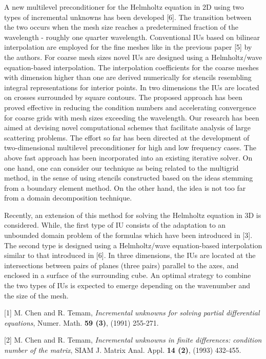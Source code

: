 \documentclass{report}
\begin{document}
A new multilevel preconditioner for the Helmholtz equation in 2D
using two types of incremental unknowns has been developed [6]. The
transition between the two occurs when the mesh size reaches a
predetermined fraction of the wavelength - roughly one quarter
wavelength. Conventional IUs based on bilinear interpolation are employed
for the fine meshes like in the previous paper [5] by the authors. For
coarse mesh sizes novel IUs are designed using a Helmholtz/wave
equation-based interpolation. The interpolation coefficients for the
coarse meshes with dimension higher than one are derived numerically for
stencils resembling integral representations for interior points. In two
dimensions the IUs are located on crosses surrounded by square contours.
The proposed approach has been proved
effective in reducing the condition numbers and accelerating
convergence for coarse grids with mesh sizes exceeding the wavelength.
Our research has been aimed at devising novel computational schemes that
facilitate analysis of large scattering problems. The effort so far has
been directed at the development of two-dimensional multilevel
preconditioner for high and low frequency cases. The above fast approach
has been incorporated into an existing iterative solver. On one hand, one
can consider our technique as being related to the multigrid method, in
the sense of using stencils constructed based on the ideas stemming from
a boundary element method. On the other hand, the idea is not too far
from a domain decomposition technique.

Recently, an extension of this method for solving the Helmholtz equation
in 3D is considered. While, the first type of IU consists of the
adaptation to an unbounded domain problem of the formulas which have been
introduced in [3]. The second type is designed using a Helmholtz/wave
equation-based interpolation similar to that introduced in [6].
In three dimensions, the IUs are located at the intersections between
pairs of planes (three pairs) parallel to the axes, and enclosed in a
surface of the surrounding cube.
An optimal strategy to combine the two types of IUs is expected to emerge
depending on the wavenumber and the size of the mesh.


[1] M. Chen and R. Temam,
{\em Incremental unknowns for solving partial differential equations},
Numer. Math. {\bf 59 (3)}, (1991) 255-271.

[2] M. Chen and R. Temam,
{\em Incremental unknowns in finite differences: condition number of the matrix},
SIAM J. Matrix Anal. Appl. {\bf 14 (2)}, (1993) 432-455.
\end{document}
